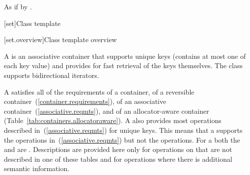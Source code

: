 \begin{itemdescr}
\pnum
\effects
As if by .
\end{itemdescr}

[set]{Class template }

[set.overview]{Class template  overview}

\pnum
{}%
A
is an associative container that supports unique keys (contains at most one of each key value) and
provides for fast retrieval of the keys themselves.
The
 class
supports bidirectional iterators.

\pnum
A  satisfies all of the requirements of a container, of a reversible
container~(\ref{container.requirements}), of an associative
container~(\ref{associative.reqmts}), and of an allocator-aware container
(Table~\ref{tab:containers.allocatoraware}).
A
also provides most operations described in~(\ref{associative.reqmts})
for unique keys.
This means that a
supports the
operations in~(\ref{associative.reqmts})
but not the
operations.
For a
both the
and
are
.
Descriptions are provided here only for operations on
that are not described in one of these tables
and for operations where there is additional semantic information.

